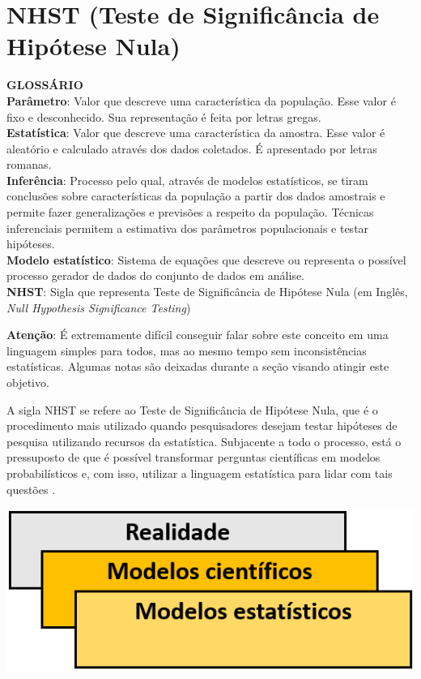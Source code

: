 \documentclass[
]{book}
\begin{document}
\hypertarget{nhst-teste-de-significuxe2ncia-de-hipuxf3tese-nula}{%
\section{NHST (Teste de Significância de Hipótese Nula)}\label{nhst-teste-de-significuxe2ncia-de-hipuxf3tese-nula}}

\textbf{GLOSSÁRIO}\\
\textbf{Parâmetro}: Valor que descreve uma característica da população. Esse valor é fixo e desconhecido. Sua representação é feita por letras gregas.\\
\textbf{Estatística}: Valor que descreve uma característica da amostra. Esse valor é aleatório e calculado através dos dados coletados. É apresentado por letras romanas.\\
\textbf{Inferência}: Processo pelo qual, através de modelos estatísticos, se tiram conclusões sobre características da população a partir dos dados amostrais e permite fazer generalizações e previsões a respeito da população. Técnicas inferenciais permitem a estimativa dos parâmetros populacionais e testar hipóteses.\\
\textbf{Modelo estatístico}: Sistema de equações que descreve ou representa o possível processo gerador de dados do conjunto de dados em análise.\\
\textbf{NHST}: Sigla que representa Teste de Significância de Hipótese Nula (em Inglês, \emph{Null Hypothesis Significance Testing})

\textbf{Atenção}: É extremamente difícil conseguir falar sobre este conceito em uma linguagem simples para todos, mas ao mesmo tempo sem inconsistências estatísticas. Algumas notas são deixadas durante a seção visando atingir este objetivo.

A sigla NHST se refere ao Teste de Significância de Hipótese Nula, que é o procedimento mais utilizado quando pesquisadores desejam testar hipóteses de pesquisa utilizando recursos da estatística. Subjacente a todo o processo, está o pressuposto de que é possível transformar perguntas científicas em modelos probabilísticos e, com isso, utilizar a linguagem estatística para lidar com tais questões \citep{Curley013}.

\includegraphics{./img/cap_inferencia_modelos_estatisticos.png}
\end{document}
